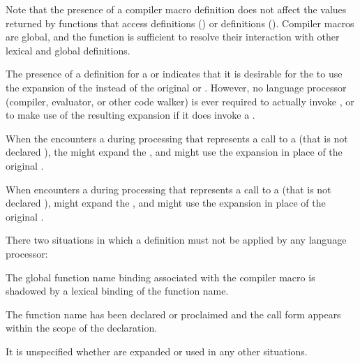 Note that the presence of a compiler macro definition does not affect
the values returned by
functions that access  definitions (\eg {})
or  definitions (\eg {}).
Compiler macros are global, and the function
 is sufficient to resolve their interaction
with other lexical and global definitions.

\endsubsubsubsection%


The presence of a  definition for a  or 
indicates that it is desirable for the  to use the expansion
of the  instead of the original  or
.  However, no language processor
(compiler, evaluator, or other code walker) is ever required to actually
invoke , or to 
make use of the resulting expansion if it does invoke 
a .

When the  encounters a  during processing that represents
a call to a   (that is not declared ),
the  might expand the , 
and might use the expansion in place of the original .

When  encounters a  during processing that represents 
a call to a   (that is not declared ),
 might expand the ,
and might use the expansion in place of the original .

There two situations in which a  definition must not be
applied by any language processor:

\beginlist
\itemitem{\bull}
 The global function name binding associated with the compiler
 macro is shadowed by a lexical binding of the function name.

\itemitem{\bull}
 The function name has been declared or proclaimed  and
 the call form appears within the scope of the declaration.
\endlist

It is unspecified whether  are expanded or used in any other
situations.

